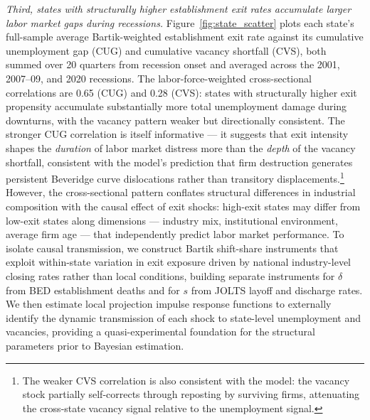 \documentclass[authoryear, review, 12pt]{elsarticle}
\begin{document}
	\textit{Third, states with structurally higher establishment exit rates 
	accumulate larger labor market gaps during recessions.} 
	Figure~\ref{fig:state_scatter} plots each state's full-sample 
	average Bartik-weighted establishment exit rate against its 
	cumulative unemployment gap (CUG) and cumulative vacancy shortfall 
	(CVS), both summed over 20 quarters from recession onset and 
	averaged across the 2001, 2007--09, and 2020 recessions. The 
	labor-force-weighted cross-sectional correlations are 0.65 (CUG) 
	and 0.28 (CVS): states with structurally higher exit propensity 
	accumulate substantially more total unemployment damage during 
	downturns, with the vacancy pattern weaker but directionally 
	consistent. The stronger CUG correlation is itself informative --- 
	it suggests that exit intensity shapes the \emph{duration} of 
	labor market distress more than the \emph{depth} of the vacancy 
	shortfall, consistent with the model's prediction that firm 
	destruction generates persistent Beveridge curve dislocations 
	rather than transitory displacements.\footnote{The weaker CVS 
		correlation is also consistent with the model: the vacancy stock 
		partially self-corrects through reposting by surviving firms, 
		attenuating the cross-state vacancy signal relative to the 
		unemployment signal.} However, the cross-sectional pattern 
	conflates structural differences in industrial composition with 
	the causal effect of exit shocks: high-exit states may differ 
	from low-exit states along dimensions --- industry mix, 
	institutional environment, average firm age --- that independently 
	predict labor market performance. To isolate causal transmission, 
	we construct Bartik shift-share instruments 
	that exploit within-state variation in exit exposure driven by 
	national industry-level closing rates rather than local conditions, 
	building separate instruments for $\delta$ from BED establishment
	deaths and for $s$ from JOLTS layoff and discharge rates. We 
	then estimate local projection impulse response functions to 
	externally identify the dynamic transmission of each shock to 
	state-level unemployment and vacancies, providing a 
	quasi-experimental foundation for the structural parameters prior 
	to Bayesian estimation.
\end{document}

